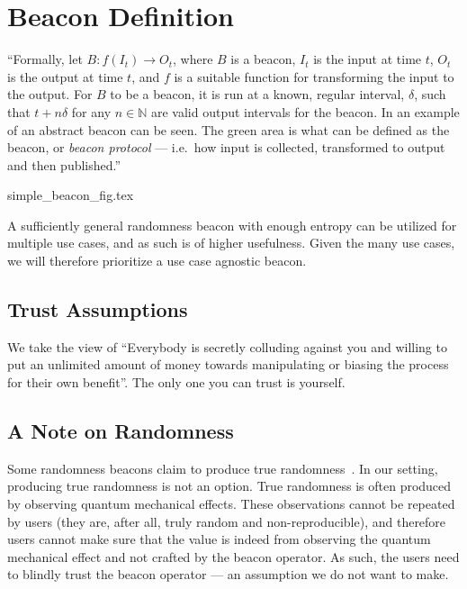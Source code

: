 \section{Beacon Definition}


\enquote{Formally, let $B: f(I_t) \rightarrow O_t$, where $B$ is a beacon, $I_t$ is the input at time $t$, $O_t$ is the output at time $t$, and $f$ is a suitable function for transforming the input to the output.
For $B$ to be a beacon, it is run at a known, regular interval, $\delta$, such that $t+n\delta$ for any $n \in \mathbb{N}$ are valid output intervals for the beacon.
In  an example of an abstract beacon can be seen.
The green area is what can be defined as the beacon, or \emph{beacon protocol} --- i.e.\ how input is collected, transformed to output and then published.}

{simple_beacon_fig.tex}

A sufficiently general randomness beacon with enough entropy can be utilized for multiple use cases, and as such is of higher usefulness.
Given the many use cases, we will therefore prioritize a use case agnostic beacon.

\subsection{Trust Assumptions}

We take the view of \enquote{Everybody is secretly colluding against you and willing to put an unlimited amount of money towards manipulating or biasing the process for their own benefit}.
The only one you can trust is yourself.

\subsection{A Note on Randomness}
Some randomness beacons claim to produce true randomness~\cite{nistbeacon}.
In our setting, producing true randomness is not an option.
True randomness is often produced by observing quantum mechanical effects.
These observations cannot be repeated by users (they are, after all, truly random and non-reproducible), and therefore users cannot make sure that the value is indeed from observing the quantum mechanical effect and not crafted by the beacon operator.
As such, the users need to blindly trust the beacon operator  --- an assumption we do not want to make.

